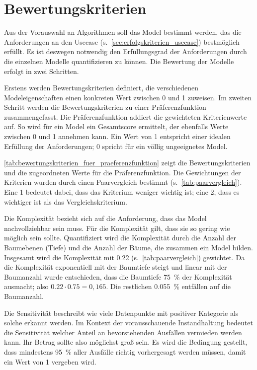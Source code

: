 \section{Bewertungskriterien}
\label{sec:bewertungskriterien}
Aus der Vorauswahl an Algorithmen soll das Model bestimmt werden, das die Anforderungen an den Usecase (s.~\cref{sec:erfolgskriterien_usecase}) bestmöglich erfüllt. Es ist deswegen notwendig den Erfüllungsgrad der Anforderungen durch die einzelnen Modelle quantifizieren zu können. Die Bewertung der Modelle erfolgt in zwei Schritten.

Erstens werden Bewertungskriterien definiert, die verschiedenen Modeleigenschaften einen konkreten Wert zwischen \num{0} und \num{1} zuweisen. Im zweiten Schritt werden die Bewertungskriterien zu einer Präferenzfunktion zusammengefasst. Die Präferenzfunktion addiert die gewichteten Kriterienwerte auf. So wird für ein Model ein Gesamtscore ermittelt, der ebenfalls Werte zwischen \num{0} und \num{1} annehmen kann. Ein Wert von \num{1} entspricht einer idealen Erfüllung der Anforderungen; \num{0} spricht für ein völlig ungeeignetes Model.

\cref{tab:bewertungskriterien_fuer_praeferenzfunktion} zeigt die Bewertungskriterien und die zugeordneten Werte für die Präferenzfunktion. Die Gewichtungen der Kriterien wurden durch einen Paarvergleich bestimmt (s.~\cref{tab:paarvergleich}). Eine \num{1} bedeutet dabei, dass das Kriterium weniger wichtig ist; eine \num{2}, dass es wichtiger ist als das Vergleichskriterium.

Die Komplexität bezieht sich auf die Anforderung, dass das Model nachvollziehbar sein muss. Für die Komplexität gilt, dass sie so gering wie möglich sein sollte. Quantifiziert wird die Komplexität durch die Anzahl der Baumebenen (Tiefe) und die Anzahl der Bäume, die zusammen ein Model bilden. Insgesamt wird die Komplexität mit \num{0,22} (s.~\cref{tab:paarvergleich}) gewichtet. Da die Komplexität exponentiell mit der Baumtiefe steigt und linear mit der Baumanzahl wurde entschieden, dass die Baumtiefe \SI{75}{\percent} der Komplexität ausmacht; also $0.22\cdot0.75=0,165$. Die restlichen \SI{0.055}{\percent} entfällen auf die Baumanzahl.

Die Sensitivität beschreibt wie viele Datenpunkte mit positiver Kategorie als solche erkannt werden. Im Kontext der vorausschauende Instandhaltung bedeutet die Sensitivität welcher Anteil an bevorstehenden Ausfällen vermieden werden kann. Ihr Betrag sollte also möglichst groß sein. Es wird die Bedingung gestellt, dass mindestens \SI{95}{\percent} aller Ausfälle richtig vorhergesagt werden müssen, damit ein Wert von \num{1} vergeben wird.

